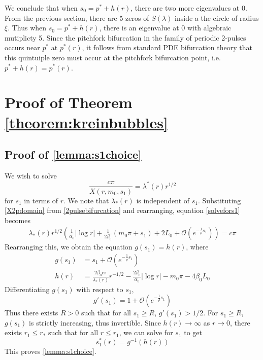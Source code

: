 \documentclass[thesis.tex]{subfiles}
\begin{document}
We conclude that when $s_0 = p^* + h(r)$, there are two more eigenvalues at 0. From the previous section, there are 5 zeros of $S(\lambda)$ inside a the circle of radius $\xi$. Thus when $s_0 = p^* + h(r)$, there is an eigenvalue at 0 with algebraic mutiplicty 5. Since the pitchfork bifurcation in the family of periodic 2-pulses occurs near $p^*$ at $p^*(r)$, it follows from standard PDE bifurcation theory that this quintuiple zero must occur at the pitchfork bifurcation point, i.e. $p^* + h(r) = p^*(r)$.

\section{Proof of Theorem \ref{theorem:kreinbubbles}}

\subsection{Proof of \cref{lemma:s1choice}}

We wish to solve
\begin{equation}\label{solvefors1}
\frac{c \pi}{X(r, m_0, s_1)} = \lambda^*(r) r^{1/2}
\end{equation}
for $s_1$ in terms of $r$. We note that $\lambda_*(r)$ is independent of $s_1$. Substituting \cref{X2pdomain} from \cref{2pulsebifurcation} and rearranging, equation \cref{solvefors1} becomes
\begin{align*}
\lambda_*(r) r^{1/2} \left( \frac{1}{\alpha_0} |\log r| + \frac{1}{2\beta_0} (m_0 \pi + s_1 ) + 2 L_0 + \mathcal{O}\left(e^{-\frac{1}{\rho}s_1}\right) \right) = c \pi
\end{align*}
Rearranging this, we obtain the equation $g(s_1) = h(r)$, where
\begin{align*}
g(s_1) &= s_1 + \mathcal{O}\left(e^{-\frac{1}{\rho}s_1}\right) \\
h(r) &= \frac{2 \beta_0 c \pi}{\lambda_*(r)} r^{-1/2} - \frac{2 \beta_0}{\alpha_0} |\log r| - m_0 \pi - 4 \beta_0 L_0
\end{align*}
Differentiating $g(s_1)$ with respect to $s_1$, 
\[
g'(s_1) = 1 + \mathcal{O}\left(e^{-\frac{1}{\rho}s_1}\right)
\]
Thus there exists $R > 0$ such that for all $s_1 \geq R$, $g'(s_1) > 1/2$. For $s_1 \geq R$, $g(s_1)$ is strictly increasing, thus invertible. Since $h(r) \rightarrow \infty$ as $r \rightarrow 0$, there exists $r_1 \leq r_*$ such that for all $r \leq r_1$, we can solve for $s_1$ to get
\[
s_1^*(r) = g^{-1}(h(r))
\]
This proves \cref{lemma:s1choice}.
\end{document}
